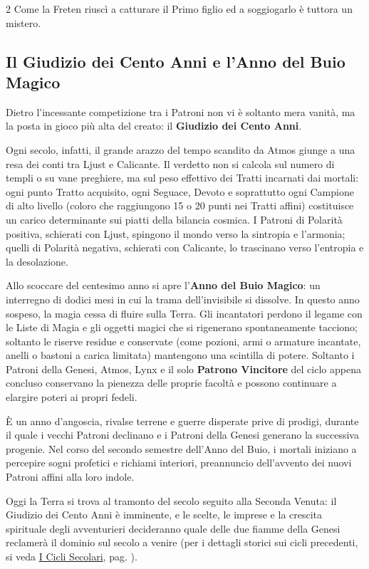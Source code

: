 \begin{multicols}{2}
Come la Freten riuscì a catturare il Primo figlio ed a soggiogarlo è tuttora un mistero.

\subsection{Il Giudizio dei Cento Anni e l'Anno del Buio Magico}\label{giudiziocentoanni}\hypertarget{giudiziocentoanni}{}

Dietro l'incessante competizione tra i Patroni non vi è soltanto mera vanità, ma la posta in gioco più alta del creato: il \textbf{Giudizio dei Cento Anni}. 

Ogni secolo, infatti, il grande arazzo del tempo scandito da Atmos giunge a una resa dei conti tra Ljust e Calicante. Il verdetto non si calcola sul numero di templi o su vane preghiere, ma sul peso effettivo dei Tratti incarnati dai mortali: ogni punto Tratto acquisito, ogni Seguace, Devoto e soprattutto ogni Campione di alto livello (coloro che raggiungono 15 o 20 punti nei Tratti affini) costituisce un carico determinante sui piatti della bilancia cosmica. I Patroni di Polarità positiva, schierati con Ljust, spingono il mondo verso la sintropia e l'armonia; quelli di Polarità negativa, schierati con Calicante, lo trascinano verso l'entropia e la desolazione.

Allo scoccare del centesimo anno si apre l'\textbf{Anno del Buio Magico}: un interregno di dodici mesi in cui la trama dell'invisibile si dissolve. In questo anno sospeso, la magia cessa di fluire sulla Terra. Gli incantatori perdono il legame con le Liste di Magia e gli oggetti magici che si rigenerano spontaneamente tacciono; soltanto le riserve residue e conservate (come pozioni, armi o armature incantate, anelli o bastoni a carica limitata) mantengono una scintilla di potere. Soltanto i Patroni della Genesi, Atmos, Lynx e il solo \textbf{Patrono Vincitore} del ciclo appena concluso conservano la pienezza delle proprie facoltà e possono continuare a elargire poteri ai propri fedeli.

È un anno d'angoscia, rivalse terrene e guerre disperate prive di prodigi, durante il quale i vecchi Patroni declinano e i Patroni della Genesi generano la successiva progenie. Nel corso del secondo semestre dell'Anno del Buio, i mortali iniziano a percepire sogni profetici e richiami interiori, preannuncio dell'avvento dei nuovi Patroni affini alla loro indole.

Oggi la Terra si trova al tramonto del secolo seguito alla Seconda Venuta: il Giudizio dei Cento Anni è imminente, e le scelte, le imprese e la crescita spirituale degli avventurieri decideranno quale delle due fiamme della Genesi reclamerà il dominio sul secolo a venire (per i dettagli storici sui cicli precedenti, si veda \hyperlink{ilprimociclo}{I Cicli Secolari}, pag. \pageref{ilprimociclo}).


\end{multicols}
